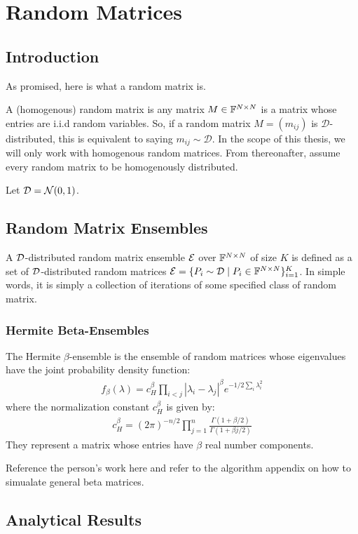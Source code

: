 \chapter{Random Matrices}

\section{Introduction}
As promised, here is what a random matrix is.

\begin{definition}
A (homogenous) random matrix is any matrix $M \in \mathbb{F}^{N \times N}$ is a matrix whose entries are i.i.d random variables. So, if a random matrix $M = (m_{ij})$ is $\mathcal{D}$-distributed, this is equivalent to saying $m_{ij} \sim \mathcal{D}$. In the scope of this thesis, we will only work with homogenous random matrices. From thereonafter, assume every random matrix to be homogenously distributed. 
\end{definition}

\begin{example}
Let $\mathcal{D} = \mathcal{N}(0,1)$. 
\end{example}

\section{Random Matrix Ensembles}

\begin{definition}
A $\mathcal{D}$-distributed random matrix ensemble $\mathcal{E}$ over $\mathbb{F}^{N \times N}$ of size $K$ is defined as a set of $\mathcal{D}$-distributed random matrices $\mathcal{E} = \{P_i \sim \mathcal{D} \mid P_i \in \mathbb{F}^{N \times N}\}_{i = 1}^K$. In simple words, it is simply a collection of iterations of some specified class of random matrix.
\end{definition}

\subsection{Hermite Beta-Ensembles}

\begin{definition}
The Hermite $\beta$-ensemble is the ensemble of random matrices whose eigenvalues have the joint probability density function:
\begin{align*}
f_\beta(\lambda) = c_H^\beta \prod_{i < j} |\lambda_i - \lambda_j|^\beta e^{-1/2\sum_i \lambda_i^2}
\end{align*}
where the normalization constant $c_H^\beta$ is given by:
\begin{align*}
c_H^\beta = (2\pi)^{-n/2} \prod_{j = 1}^n \frac{\Gamma(1 + \beta/2)}{\Gamma(1 + \beta j/2)}
\end{align*}
They represent a matrix whose entries have $\beta$ real number components.
\end{definition}

Reference the person's work here and refer to the algorithm appendix on how to simualate general beta matrices.

\section{Analytical Results}




